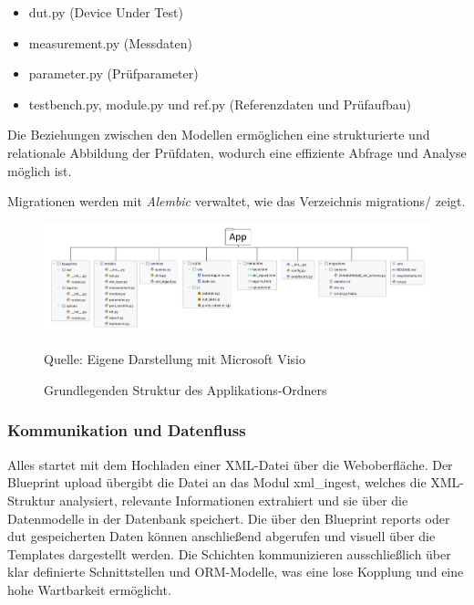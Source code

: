 \begin{itemize}

\item
dut.py (Device Under Test)

\item
measurement.py (Messdaten)

\item
parameter.py (Prüfparameter)

\item
testbench.py, module.py und ref.py (Referenzdaten und Prüfaufbau)

\end{itemize}

Die Beziehungen zwischen den Modellen ermöglichen eine strukturierte und relationale Abbildung der Prüfdaten, wodurch eine effiziente Abfrage und Analyse möglich ist.

Migrationen werden mit \textit{Alembic} verwaltet, wie das Verzeichnis migrations/ zeigt.


\begin{figure}[H]
    \centering
    \includegraphics[width=1\textwidth]{Grafiken/Min Ordnerstruktur Projekt}
    \caption{Grundlegenden Struktur des Applikations-Ordners}
    \label{fig: Grundlegenden Struktur des Applikations-Ordners}
    {Quelle: Eigene Darstellung mit Microsoft Visio}
\end{figure}

\subsubsection{Kommunikation und Datenfluss}

Alles startet mit dem Hochladen einer XML-Datei über die Weboberfläche.
Der Blueprint upload übergibt die Datei an das Modul xml\_ingest, welches die XML-Struktur analysiert, relevante Informationen extrahiert und sie über die Datenmodelle in der Datenbank speichert.
 Die über den Blueprint reports oder dut gespeicherten Daten können anschließend abgerufen und visuell über die Templates dargestellt werden.
 Die Schichten kommunizieren ausschließlich über klar definierte Schnittstellen und ORM-Modelle, was eine lose Kopplung und eine hohe Wartbarkeit ermöglicht.








